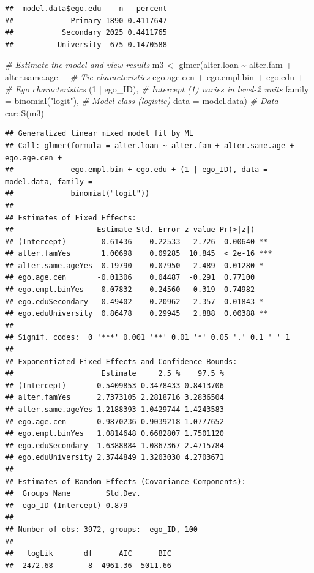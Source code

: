 \documentclass[
]{book}
\newenvironment{Shaded}{\begin{snugshade}}{\end{snugshade}}
\newcommand{\AttributeTok}[1]{\textcolor[rgb]{0.77,0.63,0.00}{#1}}
\newcommand{\CommentTok}[1]{\textcolor[rgb]{0.56,0.35,0.01}{\textit{#1}}}
\newcommand{\DecValTok}[1]{\textcolor[rgb]{0.00,0.00,0.81}{#1}}
\newcommand{\FunctionTok}[1]{\textcolor[rgb]{0.00,0.00,0.00}{#1}}
\newcommand{\NormalTok}[1]{#1}
\newcommand{\OtherTok}[1]{\textcolor[rgb]{0.56,0.35,0.01}{#1}}
\newcommand{\SpecialCharTok}[1]{\textcolor[rgb]{0.00,0.00,0.00}{#1}}
\newcommand{\StringTok}[1]{\textcolor[rgb]{0.31,0.60,0.02}{#1}}
\begin{document}
\begin{verbatim}
##  model.data$ego.edu    n   percent
##             Primary 1890 0.4117647
##           Secondary 2025 0.4411765
##          University  675 0.1470588
\end{verbatim}

\begin{Shaded}
\begin{Highlighting}[]
\CommentTok{\# Estimate the model and view results}
\NormalTok{m3 }\OtherTok{\textless{}{-}} \FunctionTok{glmer}\NormalTok{(alter.loan }\SpecialCharTok{\textasciitilde{}}\NormalTok{ alter.fam }\SpecialCharTok{+}\NormalTok{ alter.same.age }\SpecialCharTok{+} \CommentTok{\# Tie characteristics}
\NormalTok{              ego.age.cen }\SpecialCharTok{+}\NormalTok{ ego.empl.bin }\SpecialCharTok{+}\NormalTok{ ego.edu }\SpecialCharTok{+} \CommentTok{\# Ego characteristics}
\NormalTok{              (}\DecValTok{1} \SpecialCharTok{|}\NormalTok{ ego\_ID), }\CommentTok{\# Intercept (1) varies in level{-}2 units}
            \AttributeTok{family =} \FunctionTok{binomial}\NormalTok{(}\StringTok{"logit"}\NormalTok{), }\CommentTok{\# Model class (logistic)}
            \AttributeTok{data =}\NormalTok{ model.data) }\CommentTok{\# Data}
\NormalTok{car}\SpecialCharTok{::}\FunctionTok{S}\NormalTok{(m3)}
\end{Highlighting}
\end{Shaded}

\begin{verbatim}
## Generalized linear mixed model fit by ML
## Call: glmer(formula = alter.loan ~ alter.fam + alter.same.age + ego.age.cen +
##             ego.empl.bin + ego.edu + (1 | ego_ID), data = model.data, family =
##             binomial("logit"))
## 
## Estimates of Fixed Effects:
##                   Estimate Std. Error z value Pr(>|z|)    
## (Intercept)       -0.61436    0.22533  -2.726  0.00640 ** 
## alter.famYes       1.00698    0.09285  10.845  < 2e-16 ***
## alter.same.ageYes  0.19790    0.07950   2.489  0.01280 *  
## ego.age.cen       -0.01306    0.04487  -0.291  0.77100    
## ego.empl.binYes    0.07832    0.24560   0.319  0.74982    
## ego.eduSecondary   0.49402    0.20962   2.357  0.01843 *  
## ego.eduUniversity  0.86478    0.29945   2.888  0.00388 ** 
## ---
## Signif. codes:  0 '***' 0.001 '**' 0.01 '*' 0.05 '.' 0.1 ' ' 1
## 
## Exponentiated Fixed Effects and Confidence Bounds:
##                    Estimate     2.5 %    97.5 %
## (Intercept)       0.5409853 0.3478433 0.8413706
## alter.famYes      2.7373105 2.2818716 3.2836504
## alter.same.ageYes 1.2188393 1.0429744 1.4243583
## ego.age.cen       0.9870236 0.9039218 1.0777652
## ego.empl.binYes   1.0814648 0.6682807 1.7501120
## ego.eduSecondary  1.6388884 1.0867367 2.4715784
## ego.eduUniversity 2.3744849 1.3203030 4.2703671
## 
## Estimates of Random Effects (Covariance Components):
##  Groups Name        Std.Dev.
##  ego_ID (Intercept) 0.879   
## 
## Number of obs: 3972, groups:  ego_ID, 100
## 
##   logLik       df      AIC      BIC 
## -2472.68        8  4961.36  5011.66
\end{verbatim}
\end{document}
